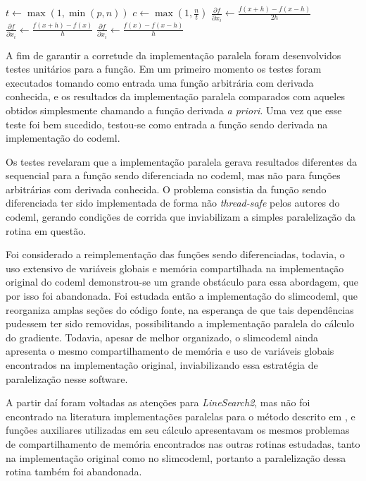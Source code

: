 \documentclass[cic,tc]{iiufrgs}
\begin{document}
\begin{algorithmic}
\State $t \gets \max(1, \min(p, n))$
\State $c \gets \max(1, \frac{n}{t})$
    \State $\frac{\partial f}{\partial x_i} \gets \frac{f(x+h)-f(x-h)}{2h}$
    \State $\frac{\partial f}{\partial x_i} \gets \frac{f(x+h)-f(x)}{h}$
  \Else
    \State $\frac{\partial f}{\partial x_i} \gets \frac{f(x)-f(x-h)}{h}$
  \EndIf
\EndFor
\end{algorithmic}

A fim de garantir a corretude da implementação paralela foram desenvolvidos
testes unitários para a função. Em um primeiro momento os testes foram
executados tomando como entrada uma função arbitrária com derivada conhecida,
e os resultados da implementação paralela comparados com aqueles obtidos
simplesmente chamando a função derivada \textit{a priori}. Uma vez que esse
teste foi bem sucedido, testou-se como entrada a função sendo derivada na
implementação do codeml.

Os testes revelaram que a implementação paralela gerava resultados diferentes
da sequencial para a função sendo diferenciada no codeml, mas não para funções
arbitrárias com derivada conhecida. O problema consistia da função sendo
diferenciada ter sido implementada de forma não \textit{thread-safe} pelos
autores do codeml, gerando condições de corrida que inviabilizam a simples
paralelização da rotina em questão.

Foi considerado a reimplementação das funções sendo diferenciadas, todavia, o
uso extensivo de variáveis globais e memória compartilhada na implementação
original do codeml demonstrou-se um grande obstáculo para essa abordagem, que
por isso foi abandonada. Foi estudada então a implementação do slimcodeml, que
reorganiza amplas seções do código fonte, na esperança de que tais
dependências pudessem ter sido removidas, possibilitando a implementação
paralela do cálculo do gradiente. Todavia, apesar de melhor organizado, o
slimcodeml ainda apresenta o mesmo compartilhamento de memória e uso de
variáveis globais encontrados na implementação original, inviabilizando essa
estratégia de paralelização nesse software.

A partir daí foram voltadas as atenções para \textit{LineSearch2}, mas não foi
encontrado na literatura implementações paralelas para o método descrito em
\cite{wolfe1978numerical}, e funções auxiliares utilizadas em seu cálculo
apresentavam os mesmos problemas de compartilhamento de memória encontrados nas
outras rotinas estudadas, tanto na implementação original como no slimcodeml,
portanto a paralelização dessa rotina também foi abandonada.
\end{document}
